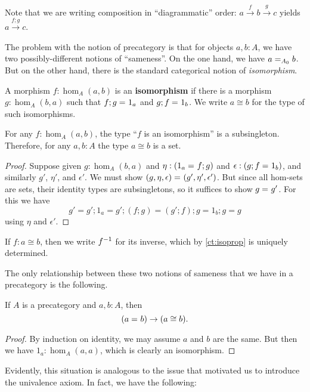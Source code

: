 Note that we are writing composition in ``diagrammatic'' order: $a\xrightarrow{f} b \xrightarrow{g}c$ yields $a \xrightarrow{f;g} c$.

The problem with the notion of precategory is that for objects $a,b:A$, we have two possibly-different notions of ``sameness''.  On the one hand, we have $\id[A_0]{a}{b}$.  But on the other hand, there is the standard categorical notion of \emph{isomorphism}.

\begin{defn}\label{ct:isomorphism}
  A morphism $f:\hom_A(a,b)$ is an \textbf{isomorphism} if there is a morphism $g:\hom_A(b,a)$ such that $\id{f;g}{1_a}$ and $\id{g;f}{1_b}$.
  We write $a\cong b$ for the type of such isomorphisms.
\end{defn}

\begin{lem}\label{ct:isoprop}
  For any $f:\hom_A(a,b)$, the type ``$f$ is an isomorphism'' is a subsingleton.
  Therefore, for any $a,b:A$ the type $a\cong b$ is a set.
\end{lem}
\begin{proof}
  Suppose given $g:\hom_A(b,a)$ and $\eta:(\id{1_a}{f; g})$ and $\epsilon:(\id{g; f}{1_b})$, and similarly $g'$, $\eta'$, and $\epsilon'$.  We must show $\id{(g,\eta,\epsilon)}{(g',\eta',\epsilon')}$.
  But since all hom-sets are sets, their identity types are subsingletons, so it suffices to show $\id g {g'}$.
  For this we have
  \[g' = g';1_a = g'; (f; g) = (g'; f); g = 1_b; g = g\]
  using $\eta$ and $\epsilon'$.
\end{proof}

If $f:a\cong b$, then we write $\inv f$ for its inverse, which by \autoref{ct:isoprop} is uniquely determined.

The only relationship between these two notions of sameness that we have in a precategory is the following.

\begin{lem}\label{ct:idtoiso}
  If $A$ is a precategory and $a,b:A$, then
  \[(\id a b)\to (a \cong b).\]
\end{lem}
\begin{proof}
  By induction on identity, we may assume $a$ and $b$ are the same.
  But then we have $1_a:\hom_A(a,a)$, which is clearly an isomorphism.
\end{proof}

Evidently, this situation is analogous to the issue that motivated us to introduce the univalence axiom.
In fact, we have the following:

